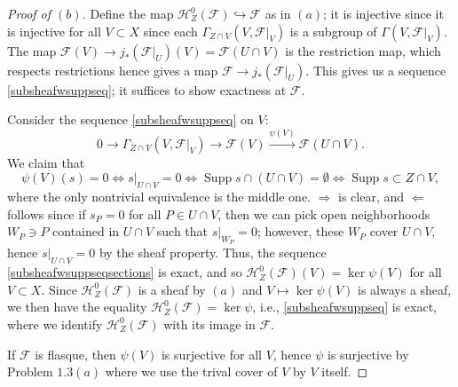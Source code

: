 \documentclass[12pt,letterpaper]{article}
\theoremstyle{definition}
\theoremstyle{remark}
\numberwithin{equation}{section}
\numberwithin{figure}{problem}
\DeclareMathOperator{\Supp}{Supp}
\begin{document}
\begin{proof}[Proof of $(b)$]
  Define the map $\mathscr{H}_Z^0(\mathscr{F}) \hookrightarrow \mathscr{F}$ as in $(a)$; it is injective since it is injective for all $V \subset X$ since each $\Gamma_{Z \cap V}(V,\mathscr{F}\vert_V)$ is a subgroup of $\Gamma(V,\mathscr{F}\vert_V)$. The map $\mathscr{F}(V) \to j_*(\mathscr{F}\vert_U)(V) = \mathscr{F}(U \cap V)$ is the restriction map, which respects restrictions hence gives a map $\mathscr{F} \to j_*(\mathscr{F}\vert_U)$. This gives us a sequence \eqref{subsheafwsuppseq}; it suffices to show exactness at $\mathscr{F}$.
  \par Consider the sequence \eqref{subsheafwsuppseq} on $V$:
  \begin{equation}\label{subsheafwsuppseqsections}
    0 \longrightarrow \Gamma_{Z\cap V}(V,\mathscr{F}\vert_V) \longrightarrow \mathscr{F}(V) \overset{\psi(V)}{\longrightarrow} \mathscr{F}(U \cap V).
  \end{equation}
  We claim that
  \begin{equation*}
    \psi(V)(s) = 0 \iff s\vert_{U \cap V} = 0 \iff \Supp s \cap (U \cap V) = \emptyset \iff \Supp s \subset Z \cap V,
  \end{equation*}
  where the only nontrivial equivalence is the middle one. $\Rightarrow$ is clear, and $\Leftarrow$ follows since if $s_P = 0$ for all $P \in U \cap V$, then we can pick open neighborhoods $W_P \ni P$ contained in $U \cap V$ such that $s\vert_{W_P} = 0$; however, these $W_P$ cover $U \cap V$, hence $s\vert_{U \cap V} = 0$ by the sheaf property. Thus, the sequence \eqref{subsheafwsuppseqsections} is exact, and so $\mathscr{H}_Z^0(\mathscr{F})(V) = \ker\psi(V)$ for all $V \subset X$. Since $\mathscr{H}_Z^0(\mathscr{F})$ is a sheaf by $(a)$ and $V \mapsto \ker\psi(V)$ is always a sheaf, we then have the equality $\mathscr{H}_Z^0(\mathscr{F}) = \ker\psi$, i.e., \eqref{subsheafwsuppseq} is exact, where we identify $\mathscr{H}_Z^0(\mathscr{F})$ with its image in $\mathscr{F}$.
  \par If $\mathscr{F}$ is flasque, then $\psi(V)$ is surjective for all $V$, hence $\psi$ is surjective by Problem $1.3(a)$ where we use the trival cover of $V$ by $V$ itself.
\end{proof}
\end{document}
